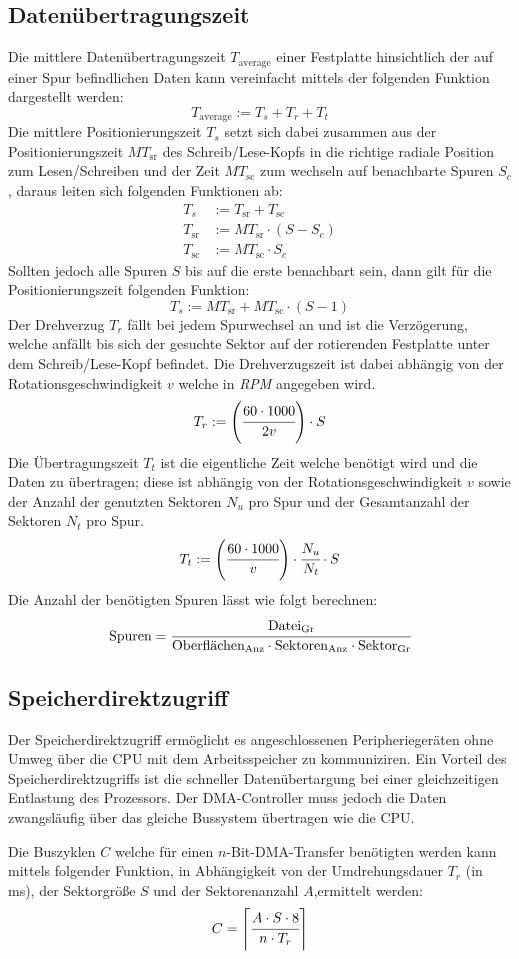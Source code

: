 \documentclass
[
	8pt,		%
	ngerman,	%
	a4paper,	%
	landscape,	%
	final		%
]{extarticle}
\begin{document}
\begin{multicols*}{4}
\subsection{Datenübertragungszeit}
Die mittlere Datenübertragungszeit $T_{\text{average}}$ einer Festplatte
hinsichtlich der auf einer Spur befindlichen Daten kann vereinfacht mittels
der folgenden Funktion dargestellt werden:
\[T_{\text{average}} := T_{s} + T_{r} + T_{t}\]
Die mittlere Positionierungszeit $T_{s}$ setzt sich dabei zusammen aus der
Positionierungszeit $MT_{\text{sr}}$ des Schreib/Lese-Kopfs in die richtige
radiale Position zum Lesen/Schreiben und der Zeit $MT_{\text{sc}}$ zum
wechseln auf benachbarte Spuren $S_{c}$, daraus leiten sich folgenden
Funktionen ab:
\begin{align*}
	T_{s}         & := T_{\text{sr}} + T_{\text{sc}} \\
	T_{\text{sr}} & := MT_{\text{sr}}\cdot (S-S_{c}) \\
	T_{\text{sc}} & := MT_{\text{sc}}\cdot S_{c}
\end{align*}
Sollten jedoch alle Spuren $S$ bis auf die erste benachbart sein, dann gilt
für die Positionierungszeit folgenden Funktion:
\[T_{s} := MT_{\text{sr}} + MT_{\text{sc}}\cdot (S-1)\]
Der Drehverzug $T_{r}$ fällt bei jedem Spurwechsel an und ist die
Verzögerung, welche anfällt bis sich der gesuchte Sektor auf der rotierenden
Festplatte unter dem Schreib/Lese-Kopf befindet. Die Drehverzugszeit ist
dabei abhängig von der Rotationsgeschwindigkeit $v$ welche in \emph{RPM}
angegeben wird. \[T_{r} := \left(\cfrac{60\cdot 1000}{2v}\right)\cdot S\]
Die Übertragungszeit $T_{t}$ ist die eigentliche Zeit welche benötigt wird
und die Daten zu übertragen; diese ist abhängig von der
Rotationsgeschwindigkeit $v$ sowie der Anzahl der genutzten Sektoren
$N_{u}$ pro Spur und der Gesamtanzahl der Sektoren $N_{t}$ pro Spur.
\[T_{t} := \left(\cfrac{60\cdot 1000}{v}\right)\cdot \cfrac{N_{u}}{N_{t}}\cdot S\]
Die Anzahl der benötigten Spuren lässt wie folgt berechnen:
\[\text{Spuren} = \cfrac{\text{Datei}_\text{Gr}}{\text{Oberflächen}_\text{Anz}\cdot \text{Sektoren}_\text{Anz}\cdot \text{Sektor}_\text{Gr}}\]
\subsection{Speicherdirektzugriff}
Der Speicherdirektzugriff ermöglicht es angeschlossenen Peripheriegeräten
ohne Umweg über die CPU mit dem Arbeitsspeicher zu kommuniziren. Ein Vorteil
des Speicherdirektzugriffs ist die schneller Datenübertargung bei einer
gleichzeitigen Entlastung des Prozessors. Der DMA-Controller muss jedoch die
Daten zwangsläufig über das gleiche Bussystem übertragen wie die CPU. \par
Die Buszyklen $C$ welche für einen $n$-Bit-DMA-Transfer benötigten werden
kann mittels folgender Funktion, in Abhängigkeit von der Umdrehungsdauer
$T_{r}$ (in ms), der Sektorgröße $S$ und der Sektorenanzahl $A$,ermittelt
werden: \[C = \left\lceil\cfrac{A\cdot S\cdot 8}{n\cdot T_{r}}\right\rceil\]


\end{multicols*}
\end{document}
